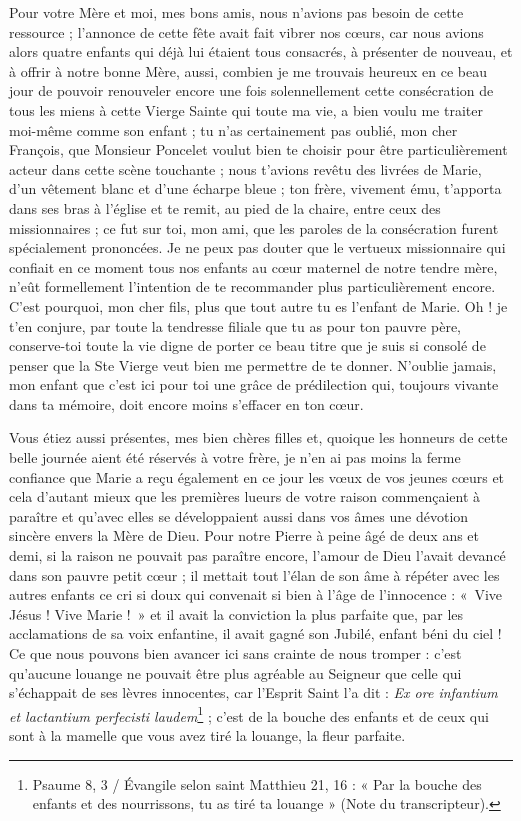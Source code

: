\documentclass[11pt,a4paper]{report}
\begin{document}
Pour votre Mère et moi, mes bons amis, nous n'avions pas besoin de cette ressource ; l'annonce de cette fête avait fait vibrer nos cœurs, car nous avions alors quatre enfants qui déjà lui étaient tous consacrés, à présenter de nouveau, et à offrir à notre bonne Mère, aussi, combien je me trouvais heureux en ce beau jour de pouvoir renouveler encore une fois solennellement cette consécration de tous les miens à cette Vierge Sainte qui toute ma vie, a bien voulu me traiter moi-même comme son enfant ; tu n'as certainement pas oublié, mon cher François, que Monsieur Poncelet voulut bien te choisir pour être particulièrement acteur dans cette scène touchante ; nous t'avions revêtu des livrées de Marie, d'un vêtement blanc et d'une écharpe bleue ; ton frère, vivement ému, t'apporta dans ses bras à l'église et te remit, au pied de la chaire, entre ceux des missionnaires ; ce fut sur toi, mon ami, que les paroles de la consécration furent spécialement prononcées. Je ne peux pas douter que le vertueux missionnaire qui confiait en ce moment tous nos enfants au cœur maternel de notre tendre mère, n'eût formellement l'intention de te recommander plus particulièrement encore. C'est pourquoi, mon cher fils, plus que tout autre tu es l'enfant de Marie. Oh ! je t'en conjure, par toute la tendresse filiale que tu as pour ton pauvre père, conserve-toi toute la vie digne de porter ce beau titre que je suis si consolé de penser que la Ste Vierge veut bien me permettre de te donner. N'oublie jamais, mon enfant que c'est ici pour toi une grâce de prédilection qui, toujours vivante dans ta mémoire, doit encore moins s'effacer en ton cœur.

Vous étiez aussi présentes, mes bien chères filles et, quoique les honneurs de cette belle journée aient été réservés à votre frère, je n'en ai pas moins la ferme confiance que Marie a reçu également en ce jour les vœux de vos jeunes cœurs et cela d'autant mieux que les premières lueurs de votre raison commençaient à paraître et qu'avec elles se développaient aussi dans vos âmes une dévotion sincère envers la Mère de Dieu. Pour notre Pierre à peine âgé de deux ans et demi, si la raison ne pouvait pas paraître encore, l'amour de Dieu l'avait devancé dans son pauvre petit cœur ; il mettait tout l'élan de son âme à répéter avec les autres enfants ce cri si doux qui convenait si bien à l'âge de l'innocence : «~Vive Jésus ! Vive Marie !~» et il avait la conviction la plus parfaite que, par les acclamations de sa voix enfantine, il avait gagné son Jubilé, enfant béni du ciel ! Ce que nous pouvons bien avancer ici sans crainte de nous tromper : c'est qu'aucune louange ne pouvait être plus agréable au Seigneur que celle qui s'échappait de ses lèvres innocentes, car l'Esprit Saint l'a dit : \textit{Ex ore infantium et lactantium perfecisti laudem}\footnote{Psaume 8, 3 / Évangile selon saint Matthieu 21, 16 : « Par la bouche des enfants et des nourrissons, tu as tiré ta louange » (Note du transcripteur).} ; c'est de la bouche des enfants et de ceux qui sont à la mamelle que vous avez tiré la louange, la fleur parfaite.
\end{document}
